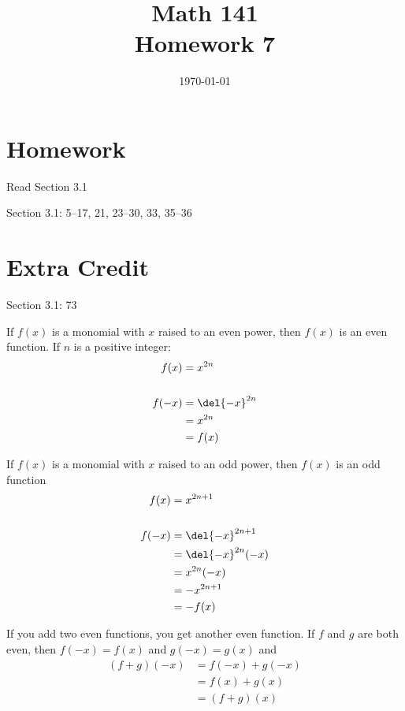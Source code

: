 \documentclass{exam}
\date{\today}
\author{}
\title{Math 141 \\ Homework 7}
\begin{document}
\maketitle

\section{Homework}

\begin{itemize*}
  \item Read Section 3.1
  \item Section 3.1: 5--17, 21, 23--30, 33, 35--36
\end{itemize*}

\ifprintanswers{}
  \pagebreak
\fi

\section{Extra Credit}
Section 3.1: 73

\ifprintanswers{}

  If $f(x)$ is a monomial with $x$ raised to an even power, then $f(x)$ is an even function.  If $n$ is a positive
  integer:
  \begin{align*}
    f(x)  &= x^{2n} \\
    \\
    f(-x) &= \del{ -x }^{2n} \\
          &= x^{2n} \\
          &= f(x) \\
  \end{align*}

  If $f(x)$ is a monomial with $x$ raised to an odd power, then $f(x)$ is an odd function
  \begin{align*}
    f(x)  &= x^{2n + 1} \\
    \\
    f(-x) &= \del{ -x }^{2n + 1} \\
          &= \del{ -x }^{2n} (-x) \\
          &= x^{2n} (-x) \\
          &= -x^{2n + 1} \\
          &= -f(x) \\
  \end{align*}

  If you add two even functions, you get another even function.  If $f$ and $g$ are both even, then $f(-x) = f(x)$ and
  $g(-x) = g(x)$ and
  \begin{align*}
    (f + g)(-x) &= f(-x) + g(-x) \\
                &= f(x) + g(x) \\
                &= (f + g)(x) \\
  \end{align*}
\end{document}
